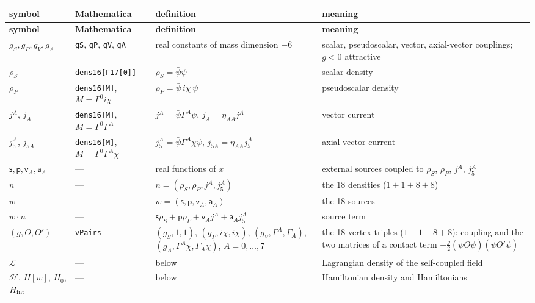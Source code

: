\documentclass[10pt,a4paper]{article}
\begin{document}
{\small
\begin{longtable}{>{\raggedright\arraybackslash}p{}>{\raggedright\arraybackslash}p{}>{\raggedright\arraybackslash}p{}>{\raggedright\arraybackslash}p{}}
\toprule
\textbf{symbol} & \textbf{Mathematica} & \textbf{definition} & \textbf{meaning} \\
\midrule\endfirsthead
\toprule
\textbf{symbol} & \textbf{Mathematica} & \textbf{definition} & \textbf{meaning} \\
\midrule\endhead
\endfoot
\bottomrule\endlastfoot
$g_S,g_P,g_V,g_A$ & \texttt{gS}, \texttt{gP}, \texttt{gV}, \texttt{gA} & real constants of mass dimension $-6$ & scalar, pseudoscalar, vector, axial-vector couplings; $g<0$ attractive \\
$\rho_S$ & \texttt{dens16[Γ17[0]]} & $\rho_S=\bar\psi\psi$ & scalar density \\
$\rho_P$ & \texttt{dens16[M]}, $M=\Gamma^0i\chi$ & $\rho_P=\bar\psi\,i\chi\,\psi$ & pseudoscalar density \\
$j^A$, $j_A$ & \texttt{dens16[M]}, $M=\Gamma^0\Gamma^A$ & $j^A=\bar\psi\Gamma^A\psi$, $j_A=\eta_{AA}j^A$ & vector current \\
$j_5^A$, $j_{5A}$ & \texttt{dens16[M]}, $M=\Gamma^0\Gamma^A\chi$ & $j_5^A=\bar\psi\Gamma^A\chi\psi$, $j_{5A}=\eta_{AA}j_5^A$ & axial-vector current \\
$\mathsf s,\mathsf p,\mathsf v_A,\mathsf a_A$ & — & real functions of $x$ & external sources coupled to $\rho_S$, $\rho_P$, $j^A$, $j_5^A$ \\
$n$ & — & $n=(\rho_S,\rho_P,j^A,j_5^A)$ & the 18 densities ($1+1+8+8$) \\
$w$ & — & $w=(\mathsf s,\mathsf p,\mathsf v_A,\mathsf a_A)$ & the 18 sources \\
$w\cdot n$ & — & $\mathsf s\rho_S+\mathsf p\rho_P+\mathsf v_Aj^A+\mathsf a_Aj_5^A$ & source term \\
$(g,O,O')$ & \texttt{vPairs} & $(g_S,1,1)$, $(g_P,i\chi,i\chi)$, $(g_V,\Gamma^A,\Gamma_A)$, $(g_A,\Gamma^A\chi,\Gamma_A\chi)$, $A=0,\dots,7$ & the 18 vertex triples ($1+1+8+8$): coupling and the two matrices of a contact term $-\frac g2(\bar\psi O\psi)(\bar\psi O'\psi)$ \\
$\mathcal L$ & — & below & Lagrangian density of the self-coupled field \\
$\mathcal H$, $H[w]$, $H_0$, $H_{\rm int}$ & — & below & Hamiltonian density and Hamiltonians \\

\end{longtable}}
\end{document}
